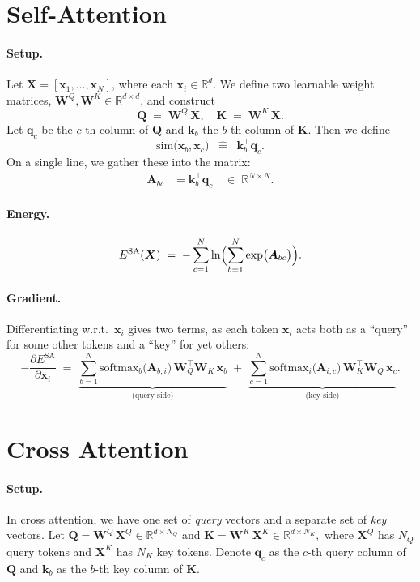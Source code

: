 \documentclass{article}
\begin{document}
\section{Self-Attention}
\paragraph{Setup.}
Let \(\bm{X} = [\bm{x}_1, \ldots, \bm{x}_N]\), where each \(\bm{x}_i \in \mathbb{R}^d\).  
We define two learnable weight matrices, \(\bm{W}^Q, \bm{W}^K \in \mathbb{R}^{d \times d}\), and construct
\[
\bm{Q} \;=\; \bm{W}^Q\,\bm{X}, 
\quad
\bm{K} \;=\; \bm{W}^K\,\bm{X}.
\]
Let \(\bm{q}_c\) be the \(c\)-th column of \(\bm{Q}\) and \(\bm{k}_b\) the \(b\)-th column of \(\bm{K}\).  Then we define
\[
\text{sim}\bigl(\bm{x}_b, \bm{x}_c\bigr)
\;\;\widehat{=}\;\;
\bm{k}_b^\top \bm{q}_c.
\]
On a single line, we gather these into the matrix:
\[
\begin{aligned}
\bm{A}_{bc} &= \bm{k}_b^\top \bm{q}_c
\quad\in\;\mathbb{R}^{N \times N}.
\end{aligned}
\]

\paragraph{Energy.}
\[
E^{\mathrm{SA}}(\bm{X})
\;=\;
-\sum_{c=1}^N 
\ln \Bigl(\sum_{b=1}^N
\exp\bigl(\bm{A}_{bc}\bigr)\Bigr).
\]

\paragraph{Gradient.}
Differentiating w.r.t.\ \(\bm{x}_i\) gives two terms, as each token \(\bm{x}_i\) acts both as a “query” for some other tokens and a “key” for yet others:
\[
-\frac{\partial E^{\mathrm{SA}}}{\partial \bm{x}_i}
\;=\;
\underbrace{
\sum_{b=1}^N 
\text{softmax}_b\!\bigl(\bm{A}_{b,i}\bigr)\,
\bm{W}_Q^\top \bm{W}_K \,\bm{x}_b
}_{\text{(query side)}}
\;+\;
\underbrace{
\sum_{c=1}^N 
\text{softmax}_i\!\bigl(\bm{A}_{i,c}\bigr)\,
\bm{W}_K^\top \bm{W}_Q \,\bm{x}_c
}_{\text{(key side)}}.
\]

\section{Cross Attention}
\paragraph{Setup.}
In cross attention, we have one set of \emph{query} vectors and a separate set of \emph{key} vectors.  Let
\(\bm{Q} = \bm{W}^Q\,\bm{X}^Q \in \mathbb{R}^{d \times N_Q}\) 
and 
\(\bm{K} = \bm{W}^K\,\bm{X}^K \in \mathbb{R}^{d \times N_K},\)
where \(\bm{X}^Q\) has \(N_Q\) query tokens and \(\bm{X}^K\) has \(N_K\) key tokens.  
Denote \(\bm{q}_c\) as the \(c\)-th query column of \(\bm{Q}\) and \(\bm{k}_b\) as the \(b\)-th key column of \(\bm{K}\).  
\end{document}
